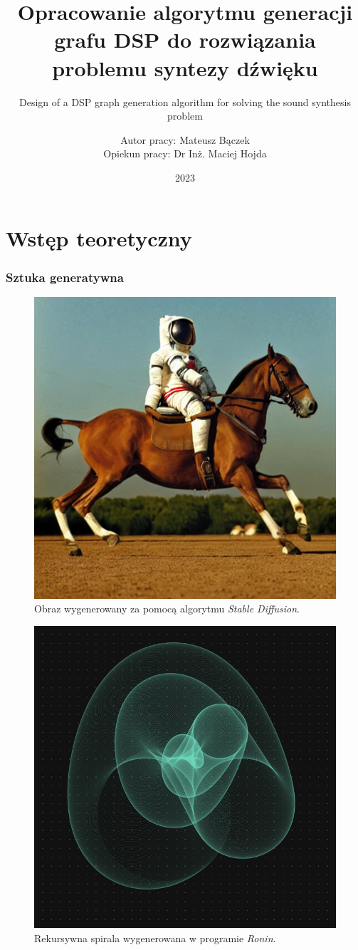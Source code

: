 \documentclass[]{beamer}
\title{Opracowanie algorytmu generacji grafu DSP do rozwiązania problemu syntezy dźwięku}
\subtitle{Design of a DSP graph generation algorithm for solving the sound synthesis problem}
\author{Autor pracy: Mateusz Bączek \\ Opiekun pracy: Dr Inż. Maciej Hojda}
\institute{Seminarium Dyplomowe -- prezentacja 1}
\date{2023}
\begin{document}
\onehalfspacing
\frame{\titlepage}

\section{Wstęp teoretyczny}


\begin{frame}
  \frametitle{Sztuka generatywna}

  \begin{multicols}{2}

  \begin{figure}
    \includegraphics[width=0.9\linewidth]{stable_diffusion.png}
    \caption{Obraz wygenerowany za pomocą algorytmu \textit{Stable Diffusion}.}
  \end{figure}

  \begin{figure}
    \includegraphics[width=0.9\linewidth]{ronin.png}
    \caption{Rekursywna spirala wygenerowana w programie \textit{Ronin}.}
  \end{figure}


\end{multicols}
\end{frame}
\end{document}
